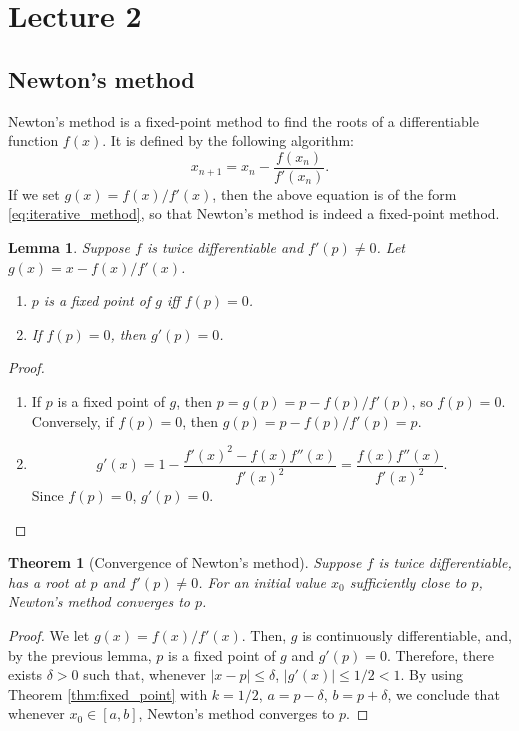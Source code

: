 \documentclass{article}
\theoremstyle{plain}
\newtheorem{theorem}[proposition]{Theorem}
\newtheorem{lemma}[proposition]{Lemma}
\theoremstyle{definition}
\begin{document}
\section{Lecture 2}

\subsection{Newton's method}

Newton's method is a fixed-point method to find the roots of a differentiable function $f(x)$.
It is defined by the following algorithm:
\begin{equation}
  x_{n+1} = x_n - \frac{f(x_n)}{f'(x_n)}.
\end{equation}
If we set $g(x) = f(x)/f'(x)$, then the above equation is of the form \eqref{eq:iterative_method}, so that Newton's method is indeed a fixed-point method.

\begin{lemma}\label{lem:newton}
  Suppose $f$ is twice differentiable and $f'(p) \neq 0$.
  Let $g(x) = x - f(x)/f'(x)$.
  \begin{enumerate}
    \item
      $p$ is a fixed point of $g$ iff $f(p) = 0$.
    \item
      If $f(p) = 0$, then $g'(p) = 0$.
  \end{enumerate}
\end{lemma}
\begin{proof}
  \begin{enumerate}
    \item If $p$ is a fixed point of $g$, then $p = g(p) = p - f(p)/f'(p)$, so $f(p) = 0$.
      Conversely, if $f(p) = 0$, then $g(p) = p - f(p) / f'(p) = p$.
    \item
      \begin{equation*}
        g'(x) = 1 - \frac{f'(x)^2 - f(x)f''(x)}{f'(x)^2} = \frac{f(x)f''(x)}{f'(x)^2}.
      \end{equation*}
      Since $f(p) = 0$, $g'(p) = 0$.
  \end{enumerate}
\end{proof}

\begin{theorem}[Convergence of Newton's method]
Suppose $f$ is twice differentiable, has a root at $p$ and $f'(p) \neq 0$.
For an initial value $x_0$ sufficiently close to $p$, Newton's method converges to $p$.
\end{theorem}
\begin{proof}
  We let $g(x) = f(x)/f'(x)$.
  Then, $g$ is continuously differentiable, and, by the previous lemma, $p$ is a fixed point of $g$ and $g'(p) = 0$.
  Therefore, there exists $\delta > 0$ such that, whenever $|x-p| \leq \delta$, $|g'(x)| \leq 1/2 < 1$.
  By using Theorem \ref{thm:fixed_point} with $k = 1/2$, $a = p-\delta$, $b = p+\delta$, we conclude that whenever $x_0 \in [a,b]$, Newton's method converges to $p$.
\end{proof}
\end{document}
